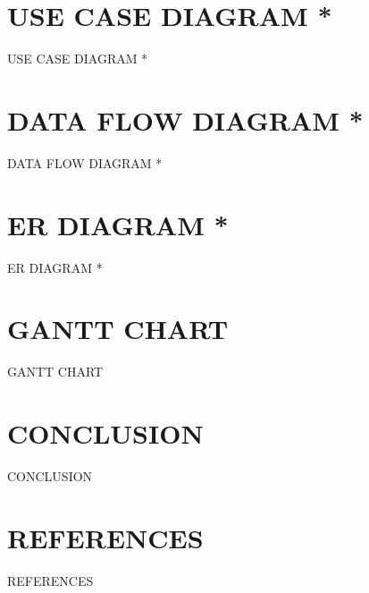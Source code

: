 \documentclass[svgnames,9pt]{beamer}
\begin{document}
\section{USE CASE DIAGRAM *}
\begin{frame}{USE CASE DIAGRAM *}	
\end{frame}
\section{DATA FLOW DIAGRAM *}
\begin{frame}{DATA FLOW DIAGRAM *}	
\end{frame}
\section{ER DIAGRAM *}
\begin{frame}{ER DIAGRAM *}	
\end{frame}
\section{GANTT CHART}
\begin{frame}{GANTT CHART}	
\end{frame}
\section{CONCLUSION }
\begin{frame}{CONCLUSION }	
\end{frame}
\section{REFERENCES }
\begin{frame}{REFERENCES }
\end{frame}
\end{document}
